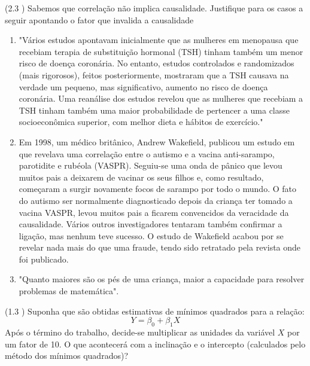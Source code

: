\documentclass[12pt,letterpaper, onecolumn]{exam}
\begin{document}
\begin{questions}
    \question (2.3 \citep{pereda_denisard}) Sabemos que correlação não implica causalidade. Justifique para os casos a seguir apontando o fator que invalida a causalidade
    \begin{enumerate} [label = (\alph*)]
        \item "Vários estudos apontavam inicialmente que as mulheres em menopausa que recebiam terapia de substituição hormonal (TSH) tinham também um menor risco de doença coronária. No entanto, estudos controlados e randomizados (mais rigorosos), feitos posteriormente, mostraram que a TSH causava na verdade um pequeno, mas significativo, aumento no risco de doença coronária. Uma reanálise dos estudos revelou que as mulheres que recebiam a TSH tinham também uma maior probabilidade de pertencer a uma classe socioeconômica superior, com melhor dieta e hábitos de exercício."
        \item Em 1998, um médico britânico, Andrew Wakefield, publicou um estudo em que revelava uma correlação entre o autismo e a vacina anti-sarampo, parotidite e rubéola (VASPR). Seguiu-se uma onda de pânico que levou muitos pais a deixarem de vacinar os seus filhos e, como resultado, começaram a surgir novamente focos de sarampo por todo o mundo. O fato do autismo ser normalmente diagnosticado depois da criança ter tomado a vacina VASPR, levou muitos pais a ficarem convencidos da veracidade da causalidade. Vários outros investigadores tentaram também confirmar a ligação, mas nenhum teve sucesso. O estudo de Wakefield acabou por se revelar nada mais do que uma fraude, tendo sido retratado pela revista onde foi publicado.
        \item "Quanto maiores são os pés de uma criança, maior a capacidade para resolver problemas de matemática".
    \end{enumerate}

    \question (1.3 \citep{pindyck_rubinfeld1998}) Suponha que são obtidas estimativas de mínimos quadrados para a relação:\begin{equation*}
        Y = \beta_0 + \beta_1X
    \end{equation*}
      Após o término do trabalho, decide-se multiplicar as unidades da variável $X$ por um fator de 10. O que acontecerá com a inclinação e o intercepto (calculados pelo método dos mínimos quadrados)?

    
\end{questions}

\end{document}
